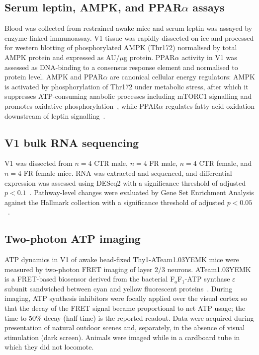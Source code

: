 \documentclass[11pt]{article}
\begin{document}
\subsection{Serum leptin, AMPK, and PPAR$\alpha$ assays}
Blood was collected from restrained awake mice and serum leptin was assayed by enzyme-linked immunoassay. V1 tissue was rapidly dissected on ice and processed for western blotting of phosphorylated AMPK (Thr172) normalised by total AMPK protein and expressed as AU/$\mu$g protein. PPAR$\alpha$ activity in V1 was assessed as DNA-binding to a consensus response element and normalised to protein level. AMPK and PPAR$\alpha$ are canonical cellular energy regulators: AMPK is activated by phosphorylation of Thr172 under metabolic stress, after which it suppresses ATP-consuming anabolic processes including mTORC1 signalling and promotes oxidative phosphorylation~\citep{steinberg2023ampk, ward2016ampk, yao2022ampk, su2019hsf1}, while PPAR$\alpha$ regulates fatty-acid oxidation downstream of leptin signalling~\citep{lopezdominguez2016omega3, laplante2013mtorc1}.

\subsection{V1 bulk RNA sequencing}
V1 was dissected from $n=4$ CTR male, $n=4$ FR male, $n=4$ CTR female, and $n=4$ FR female mice. RNA was extracted and sequenced, and differential expression was assessed using DESeq2 with a significance threshold of adjusted $p < 0.1$~\citep{love2014moderated}. Pathway-level changes were evaluated by Gene Set Enrichment Analysis against the Hallmark collection with a significance threshold of adjusted $p < 0.05$~\citep{subramanian2005gsea}.

\subsection{Two-photon ATP imaging}
ATP dynamics in V1 of awake head-fixed Thy1-ATeam1.03YEMK mice were measured by two-photon FRET imaging of layer 2/3 neurons. ATeam1.03YEMK is a FRET-based biosensor derived from the bacterial F$_\text{o}$F$_1$-ATP synthase $\varepsilon$ subunit sandwiched between cyan and yellow fluorescent proteins~\citep{imamura2009visualization, tsuyama2013ateam, ando2012visualization, kishikawa2011ateam}. During imaging, ATP synthesis inhibitors were focally applied over the visual cortex so that the decay of the FRET signal became proportional to net ATP usage; the time to 50\% decay (half-time) is the reported readout. Data were acquired during presentation of natural outdoor scenes and, separately, in the absence of visual stimulation (dark screen). Animals were imaged while in a cardboard tube in which they did not locomote.
\end{document}
